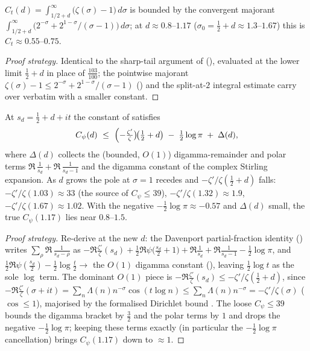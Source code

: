 \begin{lemma}
\label{lem:ls_Ct}
\leanok
{}
$C_t(d)=\int_{1/2+d}^\infty\bigl(\zeta(\sigma)-1\bigr)\,d\sigma$ is bounded by the
convergent majorant
$\int_{1/2+d}^\infty\bigl(2^{-\sigma}+2^{1-\sigma}/(\sigma-1)\bigr)\,d\sigma$; at
$d\approx0.8$--$1.17$ ($\sigma_0=\tfrac12+d\approx1.3$--$1.67$) this is
$C_t\approx0.55$--$0.75$.
\end{lemma}

\begin{proof}[Proof strategy]
\leanok
Identical to the sharp-tail argument of 
(), evaluated at the lower limit
$\tfrac12+d$ in place of $\tfrac{103}{100}$; the pointwise majorant
$\zeta(\sigma)-1\le2^{-\sigma}+2^{1-\sigma}/(\sigma-1)$
() and the
split-at-$2$ integral estimate carry over verbatim with a smaller constant.
\end{proof}

\begin{lemma}
\label{lem:ls_Cpsi}
\leanok
At $s_d=\tfrac12+d+it$ the constant of  satisfies
\[
  C_\psi(d)\ \le\ \Bigl(-\tfrac{\zeta'}{\zeta}\bigr)\!\bigl(\tfrac12+d\bigr)
    \;-\;\tfrac12\log\pi\;+\;\Delta(d),
\]
where $\Delta(d)$ collects the (bounded, $O(1)$) digamma-remainder and polar terms
$\Re\,\tfrac1{s_d}+\Re\,\tfrac1{s_d-1}$ and the digamma constant of the complex
Stirling expansion. As $d$ grows the pole at $\sigma=1$ recedes and
$-\zeta'/\zeta(\tfrac12+d)$ falls: $-\zeta'/\zeta(1.03)\approx33$ (the source of
$C_\psi\le39$), $-\zeta'/\zeta(1.32)\approx1.9$,
$-\zeta'/\zeta(1.67)\approx1.02$. With the negative $-\tfrac12\log\pi\approx-0.57$
and $\Delta(d)$ small, the true $C_\psi(1.17)$ lies near $0.8$--$1.5$.
\end{lemma}

\begin{proof}[Proof strategy]
\leanok
Re-derive  at the new
$d$: the Davenport partial-fraction identity () writes
$\sum_\rho\Re\,\tfrac1{s_d-\rho}$ as
$-\Re\tfrac{\zeta'}\zeta(s_d)+\tfrac12\Re\psi\!\bigl(\tfrac{s_d}2+1\bigr)
+\Re\tfrac1{s_d}+\Re\tfrac1{s_d-1}-\tfrac12\log\pi$, and
$\tfrac12\Re\psi(\tfrac{s_d}2)-\tfrac12\log\tfrac t2\to$ the $O(1)$ digamma constant
(), leaving $\tfrac12\log t$
as the sole $\log$ term. The dominant $O(1)$ piece is
$-\Re\tfrac{\zeta'}\zeta(s_d)\le-\zeta'/\zeta(\tfrac12+d)$, since
$-\Re\tfrac{\zeta'}\zeta(\sigma+it)=\sum_n\Lambda(n)n^{-\sigma}\cos(t\log n)
\le\sum_n\Lambda(n)n^{-\sigma}=-\zeta'/\zeta(\sigma)$ ($\cos\le1$), majorised by the
formalised Dirichlet bound
. The loose $C_\psi\le39$ bounds the digamma
bracket by $\tfrac32$ and the polar terms by $1$ and drops the negative
$-\tfrac12\log\pi$; keeping these terms exactly (in particular the $-\tfrac12\log\pi$
cancellation) brings $C_\psi(1.17)$ down to $\approx1$.
\end{proof}

